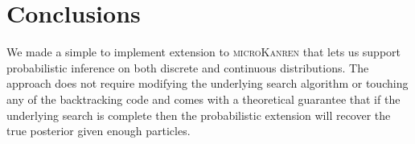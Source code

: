 \documentclass[
]{ceurart}
\begin{document}
\section{Conclusions}

We made a simple to implement extension to \textsc{microKanren} that
lets us support probabilistic inference on both discrete and
continuous distributions. The approach does not require modifying the
underlying search algorithm or touching any of the backtracking code and
comes with a theoretical guarantee that if the underlying search is
complete then the probabilistic extension will recover the true
posterior given enough particles.



\end{document}
